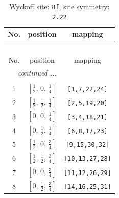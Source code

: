 \documentclass[fleqn,8pt]{jsarticle}
\begin{document}
\begin{longtable}{ccc}
\caption{Wyckoff site: {\tt 8f}, site symmetry: {\tt 2.22}}
 \\
 \hline \hline
No. & position & mapping \\ \hline \endfirsthead

\multicolumn{2}{l}{\tablename\ \thetable{}} \\
 \hline \hline
No. & position & mapping \\ \hline \endhead

 \hline \hline
\multicolumn{2}{r}{\footnotesize\it continued ...} \\ \endfoot

 \hline \hline
\multicolumn{2}{r}{} \\ \endlastfoot

1 & $\left[ \frac{1}{2},\, 0,\, \frac{1}{4} \right]$ & {\tt [1,7,22,24]} \\ \hline
2 & $\left[ \frac{1}{2},\, \frac{1}{2},\, \frac{1}{4} \right]$ & {\tt [2,5,19,20]} \\ \hline
3 & $\left[ 0,\, 0,\, \frac{1}{4} \right]$ & {\tt [3,4,18,21]} \\ \hline
4 & $\left[ 0,\, \frac{1}{2},\, \frac{1}{4} \right]$ & {\tt [6,8,17,23]} \\ \hline
5 & $\left[ \frac{1}{2},\, 0,\, \frac{3}{4} \right]$ & {\tt [9,15,30,32]} \\ \hline
6 & $\left[ \frac{1}{2},\, \frac{1}{2},\, \frac{3}{4} \right]$ & {\tt [10,13,27,28]} \\ \hline
7 & $\left[ 0,\, 0,\, \frac{3}{4} \right]$ & {\tt [11,12,26,29]} \\ \hline
8 & $\left[ 0,\, \frac{1}{2},\, \frac{3}{4} \right]$ & {\tt [14,16,25,31]} \\
\end{longtable}
\renewcommand{\arraystretch}{1.2}
\end{document}
